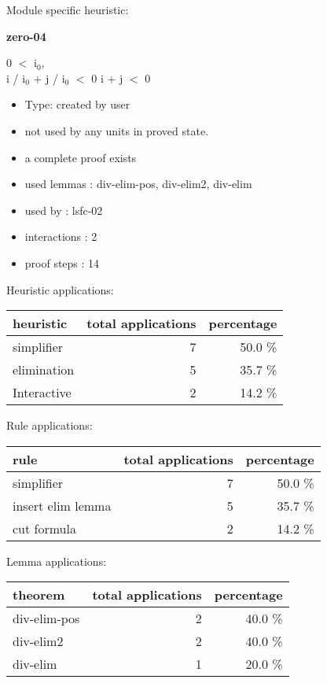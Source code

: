 \documentclass[a4paper]{article}
\begin{document}
Module specific heuristic:

\pagebreak

{\LARGE\bf zero-04}\label{lemma-zero-04}

\medskip

0 $<$ $\mbox{i}_{0}$, \\
i / $\mbox{i}_{0}$ + j / $\mbox{i}_{0}$ $<$ 0 \Fol i + j $<$ 0

\begin{itemize}

\item Type: created by user

\item not used by any units in proved state.
\item       a complete proof exists
\item       used lemmas  : div-elim-pos, div-elim2, div-elim
\item       used by      : lsfc-02
\item       interactions : 2
\item       proof steps  : 14
\end{itemize}

\medskip


Heuristic applications:

\begin{supertabular}{l|r|r}
heuristic	& total applications & percentage \\ \hline
simplifier & 7 & 50.0 \% \\
elimination & 5 & 35.7 \% \\
Interactive & 2 & 14.2 \% \\

\end{supertabular}

Rule applications:

\begin{supertabular}{l|r|r}
rule	        & total applications & percentage \\ \hline
simplifier & 7 & 50.0 \% \\
insert elim lemma & 5 & 35.7 \% \\
cut formula & 2 & 14.2 \% \\

\end{supertabular}

Lemma applications:

\begin{supertabular}{l|r|r}
theorem	        & total applications & percentage \\ \hline
div-elim-pos & 2 & 40.0 \% \\
div-elim2 & 2 & 40.0 \% \\
div-elim & 1 & 20.0 \% \\

\end{supertabular}
\end{document}
